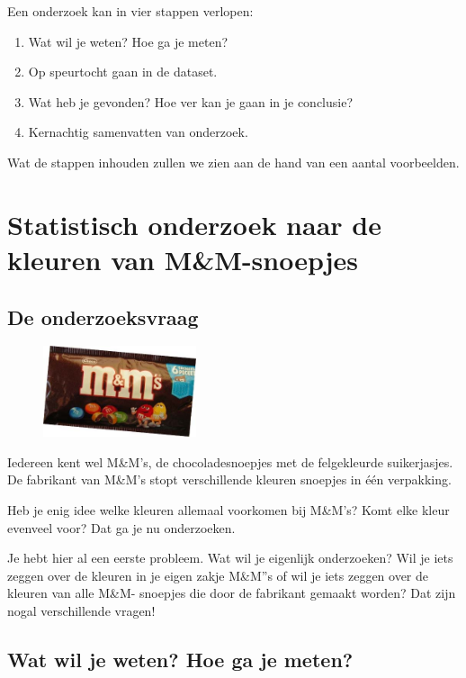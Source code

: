 \documentclass[11pt]{article}
\begin{document}
Een onderzoek kan in vier stappen verlopen:
\begin{enumerate}
  \item Wat wil je weten? Hoe ga je meten?
  \item Op speurtocht gaan in de dataset.
  \item Wat heb je gevonden? Hoe ver kan je gaan in je conclusie?
  \item Kernachtig samenvatten van onderzoek.
\end{enumerate}

Wat de stappen inhouden zullen we zien aan de hand van een aantal voorbeelden.

\section{Statistisch onderzoek naar de kleuren van M\&M-snoepjes}

\subsection{De onderzoeksvraag}

\begin{figure}
  \includegraphics[width=0.4\textwidth]{MenM-verpakking.png}
\end{figure}

Iedereen kent wel M\&M’s, de chocoladesnoepjes met de felgekleurde suikerjasjes. De fabrikant van
M\&M’s stopt verschillende kleuren snoepjes in één verpakking.

Heb je enig idee welke kleuren allemaal voorkomen bij M\&M’s?
Komt elke kleur evenveel voor? Dat ga je nu onderzoeken.

Je hebt hier al een eerste probleem. Wat wil je eigenlijk
onderzoeken? Wil je iets zeggen over de kleuren in je eigen zakje
M\&M”s of wil je iets zeggen over de kleuren van alle M\&M-
snoepjes die door de fabrikant gemaakt worden? Dat zijn nogal
verschillende vragen!

\subsection{Wat wil je weten? Hoe ga je meten?}
\end{document}
